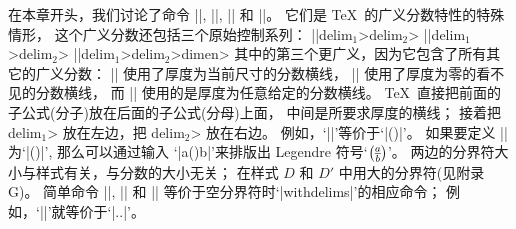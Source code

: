 \ddanger \1在本章开头，我们讨论了命令 |\over|, |\atop|, |\choose| 和 |\above|。%
它们是 \TeX\ 的广义分数特性的特殊情形，
这个广义分数还包括三个原始控制系列：
\begindisplay
|\overwithdelims|\<delim$_1$>\<delim$_2$>\cr
|\atopwithdelims|\<delim$_1$>\<delim$_2$>\cr
|\abovewithdelims|\<delim$_1$>\<delim$_2$>\<dimen>\cr
\enddisplay
其中的第三个更广义，因为它包含了所有其它的广义分数：
|\overwithdelims| 使用了厚度为当前尺寸的分数横线，
|\atopwithdelims| 使用了厚度为零的看不见的分数横线，
而 |\abovewithdelims| 使用的是厚度为任意给定的分数横线。%
 \TeX\ 直接把前面的子公式(分子)放在后面的子公式(分母)上面，
中间是所要求厚度的横线；
接着把 \<delim$_1$> 放在左边，把 \<delim$_2$> 放在右边。%
例如，`|\choose|'等价于`|\atopwithdelims()|'。%
如果要定义 |\legendre| 为`|\overwithdelims()|', 那么可以通过输入%
\def\legendre{\overwithdelims()}%
`|{a\legendre b}|'来排版出 Legendre 符号`$a\legendre b$'。%
两边的分界符大小与样式有关，与分数的大小无关；
在样式 $D$ 和 $D'$ 中用大的分界符(见附录 G)。%
简单命令 |\over|, |\atop| 和 |\above| 等价于空分界符时`|withdelims|'的相应命令；
例如，`|\over|'就等价于`|\overwithdelims..|'。

